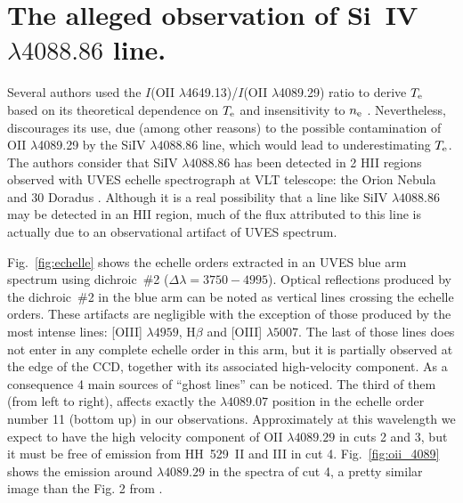 \documentclass[fleqn,usenatbib]{mnras}
\begin{document}



\newpage


\appendix


\section{The alleged observation of Si~IV \texorpdfstring{\boldmath$ \lambda 4088.86$}.  line. }
\label{sec:siiv_coment}

Several authors used the $I$(\mbox{O}\thinspace \mbox{II} $\lambda$4649.13)/$I$(\mbox{O}\thinspace \mbox{II} $\lambda$4089.29) ratio to derive $T_{\rm e}$ based on its theoretical dependence on $T_{\rm e}$ and insensitivity to $n_{\rm e}$ \citep[see e.~g.][]{garciarojas07, fangyliu13, McNabb13, wesson18}. Nevertheless, \citet{peimbert13} discourages its use, due (among other reasons) to the possible contamination of \mbox{O}\thinspace \mbox{II} $\lambda$4089.29 by the  \mbox{Si}\thinspace \mbox{IV} $\lambda 4088.86$ line, which would lead to underestimating $T_{\rm e}$. The authors consider that \mbox{Si}\thinspace \mbox{IV} $\lambda 4088.86$ has been detected in 2 H\thinspace II regions observed with UVES echelle spectrograph at VLT telescope: the Orion Nebula \citep{Esteban04} and 30 Doradus \citep{Peimbert03}. Although it is a real possibility that a line like \mbox{Si}\thinspace \mbox{IV} $\lambda 4088.86$ may be detected in an H\thinspace II region, much of the flux attributed to this line is actually due to an observational artifact of UVES spectrum. 

Fig.~\ref{fig:echelle} shows the echelle orders extracted in an UVES blue arm spectrum using dichroic~\#2 ($\Delta \lambda=3750-4995$). Optical reflections produced by the dichroic~\#2 in the blue arm can be noted as vertical lines crossing the echelle orders. These artifacts are negligible with the exception of those produced by the most intense lines: \mbox{[O}\thinspace \mbox{III]} $\lambda 4959$, H$\beta$ and \mbox{[O}\thinspace \mbox{III]} $\lambda 5007$. The last of those lines does not enter in any complete echelle order in this arm, but it is partially observed at the edge of the CCD, together with its associated high-velocity component. As a consequence 4 main sources of ``ghost lines'' can be noticed. The third of them (from left to right), affects exactly the $\lambda 4089.07$ position in the echelle order number 11 (bottom up) in our observations. Approximately at this wavelength we expect to have the high velocity component of \mbox{O}\thinspace \mbox{II} $\lambda 4089.29$ in cuts 2 and 3, but it must be free of emission from HH~529~II and III in cut 4. Fig.~\ref{fig:oii_4089} shows the emission around $\lambda 4089.29$ in the spectra of cut 4, a pretty similar image than the Fig. 2 from \citet{peimbert13}.
\end{document}
